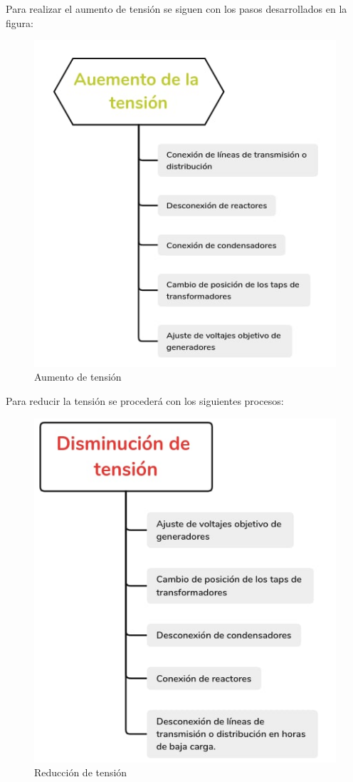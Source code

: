 \documentclass[a5paper]{book}%
\begin{document}
Para realizar el aumento de tensión se siguen con los pasos desarrollados en la figura:

\begin{figure}[H]
  \centering
  \caption{Aumento de tensión}
  \label{fig:aumentotension}
  \includegraphics[width=0.8\linewidth]{aumentartension}
\end{figure}

Para reducir la tensión se procederá con los siguientes procesos:

\begin{figure}[H]
  \centering
  \caption{Reducción de  tensión}
  \label{fig:reducciontension}
  \includegraphics[width=0.8\linewidth]{reducirtension}
\end{figure}
\end{document}
